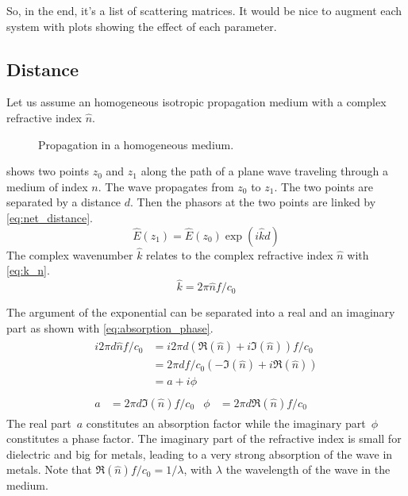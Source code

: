 So, in the end, it's a list of scattering matrices.  It would be nice to augment each system with plots showing the effect of each parameter.





\subsection{Distance}
\label{sec:generic_networks_distance}
Let us assume an homogeneous isotropic propagation medium with a complex refractive index $\hat{n}$.

\begin{figure}[hbtp]
    \centering
    \caption{\label{fig:net_distance} Propagation in a homogeneous medium.}
\end{figure}
 shows two points $z_0$ and $z_1$ along the path of a plane wave traveling through a medium of index $n$.
The wave propagates from $z_0$ to $z_1$.
The two points are separated by a distance $d$.
Then the phasors at the two points are linked by \cref{eq:net_distance}.
\begin{equation}
    \hat{E}(z_1) = \hat{E}(z_0) \exp(i\hat{k}d)
    \label{eq:net_distance}
\end{equation}
The complex wavenumber $\hat{k}$ relates to the complex refractive index $\hat{n}$ with \cref{eq:k_n}.
\begin{equation}
    \hat{k} = 2\pi \hat{n} f / c_0 \label{eq:k_n}
\end{equation}

The argument of the exponential can be separated into a real and an imaginary part as shown with \cref{eq:absorption_phase}.
\begin{gather}
    \begin{aligned}
        i 2\pi d \hat{n} f / c_0
        &= i 2\pi d \left(\Re(\hat{n}) + i\Im(\hat{n})\right) f / c_0 \\
        &= 2\pi d f / c_0 \left(-\Im(\hat{n}) + i\Re(\hat{n}) \right) \\
        &= a + i \phi
    \end{aligned}
    \label{eq:absorption_phase}
    \\
    \begin{aligned}
        a &= 2\pi d \Im(\hat{n}) f / c_0   &   \phi &= 2\pi d \Re(\hat{n}) f / c_0
    \end{aligned}
\end{gather}
The real part~$a$ constitutes an absorption factor while the imaginary part~$\phi$ constitutes a phase factor.
The imaginary part of the refractive index is small for dielectric and big for metals,
leading to a very strong absorption of the wave in metals.
Note that $\Re(\hat{n}) f / c_0 = 1 / \lambda$, with $\lambda$ the wavelength of the wave in the medium.


